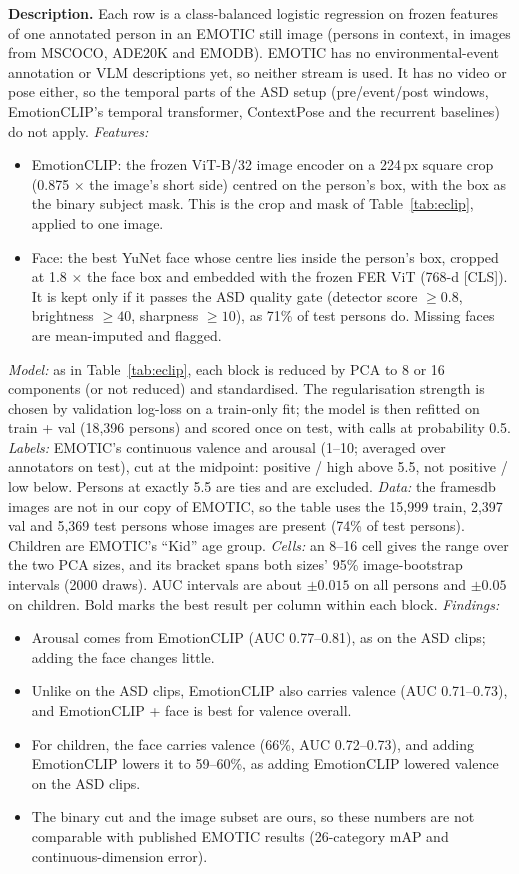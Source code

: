 \documentclass[11pt]{article}
\newcommand{\tabledesc}[1]{\par\medskip\begin{minipage}{\linewidth}\footnotesize\textbf{Description.} #1\end{minipage}}
\begin{document}
\begin{table}[!htbp]
\tabledesc{Each row is a class-balanced logistic regression on frozen features of one annotated person in an EMOTIC still image (persons in context, in images from MSCOCO, ADE20K and EMODB). EMOTIC has no environmental-event annotation or VLM descriptions yet, so neither stream is used. It has no video or pose either, so the temporal parts of the ASD setup (pre/event/post windows, EmotionCLIP's temporal transformer, ContextPose and the recurrent baselines) do not apply.
\emph{Features:}
\begin{itemize}
  \item EmotionCLIP: the frozen ViT-B/32 image encoder on a 224\,px square crop (0.875 $\times$ the image's short side) centred on the person's box, with the box as the binary subject mask. This is the crop and mask of Table~\ref{tab:eclip}, applied to one image.
  \item Face: the best YuNet face whose centre lies inside the person's box, cropped at 1.8 $\times$ the face box and embedded with the frozen FER ViT (768-d [CLS]). It is kept only if it passes the ASD quality gate (detector score $\geq 0.8$, brightness $\geq 40$, sharpness $\geq 10$), as 71\% of test persons do. Missing faces are mean-imputed and flagged.
\end{itemize}
\emph{Model:} as in Table~\ref{tab:eclip}, each block is reduced by PCA to 8 or 16 components (or not reduced) and standardised. The regularisation strength is chosen by validation log-loss on a train-only fit; the model is then refitted on train + val (18,396 persons) and scored once on test, with calls at probability 0.5.
\emph{Labels:} EMOTIC's continuous valence and arousal (1--10; averaged over annotators on test), cut at the midpoint: positive / high above 5.5, not positive / low below. Persons at exactly 5.5 are ties and are excluded.
\emph{Data:} the framesdb images are not in our copy of EMOTIC, so the table uses the 15,999 train, 2,397 val and 5,369 test persons whose images are present (74\% of test persons). Children are EMOTIC's ``Kid'' age group.
\emph{Cells:} an 8--16 cell gives the range over the two PCA sizes, and its bracket spans both sizes' 95\% image-bootstrap intervals (2000 draws). AUC intervals are about $\pm 0.015$ on all persons and $\pm 0.05$ on children. Bold marks the best result per column within each block.
\emph{Findings:}
\begin{itemize}
  \item Arousal comes from EmotionCLIP (AUC 0.77--0.81), as on the ASD clips; adding the face changes little.
  \item Unlike on the ASD clips, EmotionCLIP also carries valence (AUC 0.71--0.73), and EmotionCLIP + face is best for valence overall.
  \item For children, the face carries valence (66\%, AUC 0.72--0.73), and adding EmotionCLIP lowers it to 59--60\%, as adding EmotionCLIP lowered valence on the ASD clips.
  \item The binary cut and the image subset are ours, so these numbers are not comparable with published EMOTIC results (26-category mAP and continuous-dimension error).
\end{itemize}}
\end{table}
\end{document}
